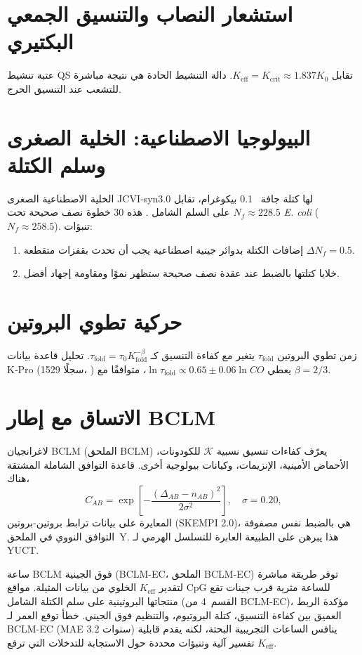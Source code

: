 \documentclass[11pt,a4paper]{article}
\newcommand{\REL}{\mathcal{K}}
\begin{document}
	\section{استشعار النصاب والتنسيق الجمعي البكتيري}
	
	عتبة تنشيط QS تقابل \(K_{\text{eff}} = K_{\mathrm{crit}} \approx 1.837 K_0\). دالة التنشيط الحادة هي نتيجة مباشرة للتشعب عند التنسيق الحرج.
	
	\section{البيولوجيا الاصطناعية: الخلية الصغرى وسلم الكتلة}
	
	الخلية الاصطناعية الصغرى JCVI‑syn3.0 لها كتلة جافة ~0.1 بيكوغرام، تقابل \(N_f \approx 228.5\) على السلم الشامل \cite{Hutchison2016, Pelletier2023}. هذه 30 خطوة نصف صحيحة تحت \textit{E. coli} (\(N_f \approx 258.5\)). تنبؤات:
	\begin{enumerate}
		\item إضافات الكتلة بدوائر جينية اصطناعية يجب أن تحدث بقفزات متقطعة \(\Delta N_f = 0.5\).
		\item خلايا كتلتها بالضبط عند عقدة نصف صحيحة ستظهر نموًا ومقاومة إجهاد أفضل.
	\end{enumerate}
	
	\section{حركية تطوي البروتين}
	
	زمن تطوي البروتين \(\tau_{\text{fold}}\) يتغير مع كفاءة التنسيق كـ \(\tau_{\text{fold}} = \tau_0 K_{\text{fold}}^{-\beta}\). تحليل قاعدة بيانات K‑Pro (1529 سجلًا، \cite{Turina2023}) يعطي \(\ln \tau_{\text{fold}} \propto 0.65 \pm 0.06 \ln CO\)، متوافقًا مع \(\beta=2/3\).
	
	\section{الاتساق مع إطار BCLM}
	
	لاغرانجيان BCLM (الملحق BCLM) يعرّف كفاءات تنسيق نسبية \(\REL\) للكودونات، الأحماض الأمينية، الإنزيمات، وكيانات بيولوجية أخرى. قاعدة التوافق الشاملة المشتقة هناك،
	\[
	C_{AB} = \exp\!\left[-\frac{(\Delta_{AB}-n_{AB})^2}{2\sigma^2}\right],\quad \sigma=0.20,
	\]
	المعايرة على بيانات ترابط بروتين-بروتين (SKEMPI 2.0)، هي بالضبط نفس مصفوفة التوافق النووي في الملحق~Y. هذا يبرهن على الطبيعة العابرة للتسلسل الهرمي لـ YUCT.
	
	ساعة BCLM فوق الجينية (BCLM-EC، الملحق BCLM-EC) توفر طريقة مباشرة لتقدير \(K_{\mathrm{eff}}\) الخلوي من بيانات المثيلة. مواقع CpG للساعة مثرية قرب جينات تقع منتجاتها البروتينية على سلم الكتلة الشامل (القسم~4 من BCLM-EC)، مؤكدة الربط العميق بين كفاءة التنسيق، كتلة البروتيوم، والتنظيم فوق الجيني. خطأ توقع العمر لـ BCLM-EC (MAE 3.2 سنوات) ينافس الساعات التجريبية البحتة، لكنه يقدم قابلية تفسير آلية وتنبؤات محددة حول الاستجابة للتدخلات التي ترفع \(K_{\mathrm{eff}}\).
	
\end{document}
